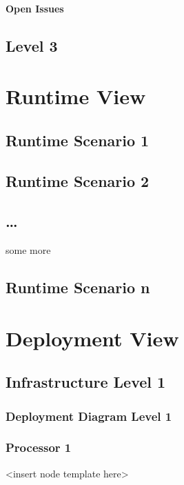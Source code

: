 \documentclass[]{article}
\begin{document}
\paragraph{Open Issues}

\subsection{Level 3}

\section{Runtime View}

\subsection{Runtime Scenario 1}

\subsection{Runtime Scenario 2}

\subsection{\ldots{}}

some more

\subsection{Runtime Scenario n}

\section{Deployment View}

\subsection{Infrastructure Level 1}

\subsubsection{Deployment Diagram Level 1}

\subsubsection{Processor 1}

\textless{}insert node template here\textgreater{}
\end{document}
